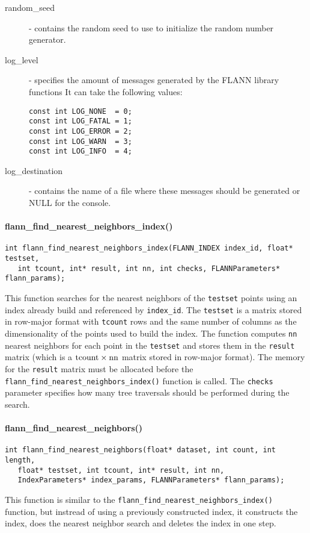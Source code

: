 \documentclass[letter,10pt]{article}
\begin{document}
\begin{description}
\begin{description}
\item [random\_seed] - contains the random seed to use to initialize the random
number generator.
 \item[log\_level] - specifies the amount of messages generated by the FLANN
library functions It can take the following values:
\begin{Verbatim}[fontsize=\footnotesize]
const int LOG_NONE  = 0;
const int LOG_FATAL = 1;
const int LOG_ERROR = 2;
const int LOG_WARN  = 3;
const int LOG_INFO  = 4;
\end{Verbatim}
\item [log\_destination] - contains the name of a file where these messages
should be generated or NULL for the console.
\end{description}
\end{description}


\paragraph{flann\_find\_nearest\_neighbors\_index()}
\begin{Verbatim}[fontsize=\footnotesize,frame=single]
int flann_find_nearest_neighbors_index(FLANN_INDEX index_id, float* testset, 
   int tcount, int* result, int nn, int checks, FLANNParameters* flann_params);
\end{Verbatim}
This function searches for the nearest neighbors of the
\texttt{testset} points using an index already build and referenced by
\texttt{index\_id}. The \texttt{testset} is a matrix stored in row-major format
with \texttt{tcount} rows and the same number of columns as the dimensionality
of the points used to build the index. The function computes \texttt{nn}
nearest neighbors for each point in the \texttt{testset} and stores them in the
\texttt{result} matrix (which is a $\rm{tcount} \times \rm{nn}$ matrix stored in
row-major format). The memory for the \texttt{result} matrix must be allocated
before the \texttt{flann\_find\_nearest\_neighbors\_index()} function is
called. The \texttt{checks} parameter specifies how many tree traversals should
be performed during the search.



\paragraph{flann\_find\_nearest\_neighbors()}
\begin{Verbatim}[fontsize=\footnotesize,frame=single]
int flann_find_nearest_neighbors(float* dataset, int count, int length,
   float* testset, int tcount, int* result, int nn, 
   IndexParameters* index_params, FLANNParameters* flann_params);
\end{Verbatim}
This function is similar to the
\texttt{flann\_find\_nearest\_neighbors\_index()} function, but instread of
using a previously constructed index, it constructs the index, does the nearest
neighbor search and deletes the index in one step.
\end{document}
